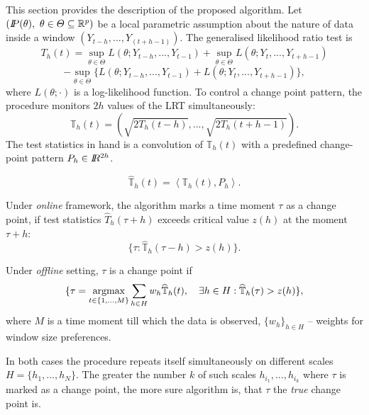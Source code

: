 \label{sec:procedure}
This section provides  the description of the proposed algorithm. Let $(\P(\theta), ~\theta \in \Theta \subseteq \mathbb{R}^p)$ be a local parametric assumption about the nature of data inside a window $(Y_{t-h},..., Y_{(t + h - 1)})$. The generalised likelihood ratio test is 
\[
T_{h}(t) = \sup_{\theta \in \Theta}L(\theta; Y_{t-h},..., Y_{t-1}) + \sup_{\theta \in \Theta}L(\theta; Y_{t},...,
Y_{t + h-1})
\]
\[
-\sup_{\theta \in \Theta}\{L(\theta; Y_{t-h},..., Y_{t-1}) + L(\theta; Y_{t},..., Y_{t+h-1})\},
\]
where $L(\theta;\cdot)$ is a log-likelihood function. 
To control a change point pattern, the procedure monitors $2h$ values of the LRT simultaneously:
\[
\mathbb{T}_h(t) = (\sqrt{2T_h(t - h)},..., \sqrt{2T_h(t + h - 1)}).
\]
The test statistics in hand is a convolution of $\mathbb{T}_h(t)$ with a predefined change-point pattern $P_h \in \R^{2h}$.

\[
    \hat{\mathbb{T}}_h(t) = \left<\mathbb{T}_h(t), P_h\right>.
\]

Under \textit{online} framework, the algorithm marks a time moment $\tau$ as a change point,  if test statistics $\hat{T}_{h}(\tau + h)$ exceeds critical value $z(h)$ at the moment $\tau + h$:
\[
\{\tau: \hat{\mathbb{T}}_{h}(\tau - h) > z(h)\}.
\]

Under \textit{offline} setting, $\tau$ is a change point if
\[
\{\tau = \argmax_{t \in \{1,...,M\}} \sum_{h \in H} w_h \dLhConv(t),\quad \exists h \in H: \hat{\mathbb{T}}_{h}(\tau) > z(h)\},
\]
where $M$ is a time moment till which the data is observed, $\{w_h\}_{h \in H}$ -- weights for window size preferences. 

In both cases the procedure repeats itself simultaneously on different scales $H = \{h_1,..., h_N\}$. The greater the number $k$ of such scales $h_{i_1},...,h_{i_k}$  where $\tau$ is marked as a change point, the more sure algorithm is, that $\tau$ the \textit{true} change point is.

